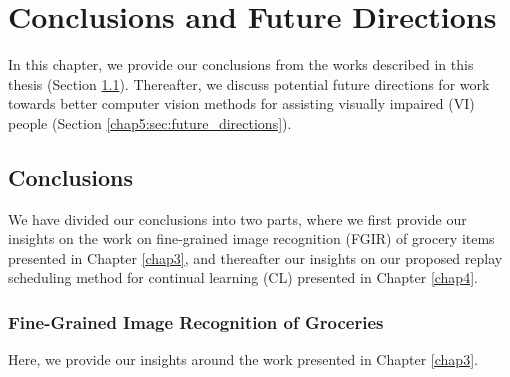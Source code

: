 
\chapter{Conclusions and Future Directions}\label{chap5}

In this chapter, we provide our conclusions from the works described in this thesis (Section \ref{chap5:sec:conclusions}). Thereafter, we discuss potential future directions for work towards better computer vision methods for assisting visually impaired (VI) people (Section \ref{chap5:sec:future_directions}). 


\section{Conclusions}\label{chap5:sec:conclusions}

We have divided our conclusions into two parts, where we first provide our insights on the work on fine-grained image recognition (FGIR) of grocery items presented in Chapter \ref{chap3}, and thereafter our insights on our proposed replay scheduling method for continual learning (CL) presented in Chapter \ref{chap4}. 


\subsection{Fine-Grained Image Recognition of Groceries}

Here, we provide our insights around the work presented in Chapter \ref{chap3}.

\vspace{-3mm}
